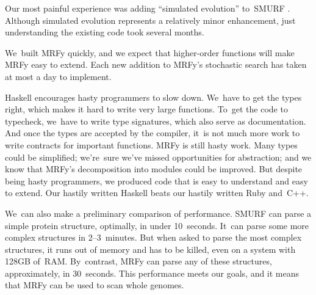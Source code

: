 \documentclass[preprint,nonatbib,blockstyle,nocopyrightspace,times]{sigplanconf}
\let\cite\citep
\begin{document}
Our most painful experience was adding ``simulated evolution''
to~SMURF \cite{Daniels:2012}. 
Although simulated evolution represents a relatively minor
enhancement,
just understanding the existing code took several months.

We~built MRFy quickly, and we expect that
higher-order functions will make MRFy easy to extend.
Each new addition to MRFy's stochastic search has taken at most a day
to implement.

%
%

Haskell encourages hasty programmers to slow down.
We~have to get the types right,
which makes it hard to write very large functions.
To~get the code to typecheck, we~have to write type signatures, which
also serve as documentation.
And once the types are accepted by the compiler,
it~is not much more work to write contracts for important functions.
MRFy is still hasty work.
Many types could be simplified;
we're~sure we've missed opportunities for abstraction;
and we know that MRFy's decomposition into modules could be improved.
But despite being hasty programmers, we produced code 
that is easy to understand and easy to extend.
Our hastily written Haskell beats
our hastily written Ruby and~C++.

We~can also make a preliminary comparison of performance.
SMURF can parse a simple protein structure, optimally, in under 10~seconds.
It~can parse some more complex structures in 2--3~minutes.
But when asked to parse the most complex structures, it runs out of
memory and has to be killed, even on a system with 128GB of~RAM.
By~contrast, MRFy can parse any of these structures, approximately,
in 30~seconds.
This performance
meets our goals, and it means that MRFy can be used to scan whole genomes.
\end{document}
